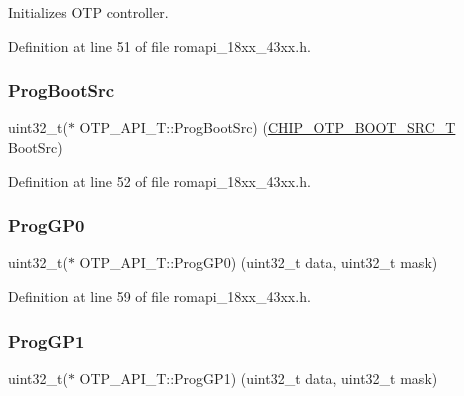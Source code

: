 Initializes O\+TP controller. 

Definition at line 51 of file romapi\+\_\+18xx\+\_\+43xx.\+h.

\mbox{\label{struct_o_t_p___a_p_i___t_a763052826438d473aefbeb87e1c2ffa4}} 
\subsubsection{\texorpdfstring{Prog\+Boot\+Src}{ProgBootSrc}}
{\footnotesize\ttfamily uint32\+\_\+t($\ast$ O\+T\+P\+\_\+\+A\+P\+I\+\_\+\+T\+::\+Prog\+Boot\+Src) (\hyperlink{group___o_t_p__18_x_x__43_x_x_gada36d39d34c8821f0416a852faa926f6}{C\+H\+I\+P\+\_\+\+O\+T\+P\+\_\+\+B\+O\+O\+T\+\_\+\+S\+R\+C\+\_\+T} Boot\+Src)}



Definition at line 52 of file romapi\+\_\+18xx\+\_\+43xx.\+h.

\mbox{\label{struct_o_t_p___a_p_i___t_a602d126fb1fed0fe8e0588132a02a8ba}} 
\subsubsection{\texorpdfstring{Prog\+G\+P0}{ProgGP0}}
{\footnotesize\ttfamily uint32\+\_\+t($\ast$ O\+T\+P\+\_\+\+A\+P\+I\+\_\+\+T\+::\+Prog\+G\+P0) (uint32\+\_\+t data, uint32\+\_\+t mask)}



Definition at line 59 of file romapi\+\_\+18xx\+\_\+43xx.\+h.

\mbox{\label{struct_o_t_p___a_p_i___t_a4cec379080f6a888ef102fd9b43d2354}} 
\subsubsection{\texorpdfstring{Prog\+G\+P1}{ProgGP1}}
{\footnotesize\ttfamily uint32\+\_\+t($\ast$ O\+T\+P\+\_\+\+A\+P\+I\+\_\+\+T\+::\+Prog\+G\+P1) (uint32\+\_\+t data, uint32\+\_\+t mask)}



